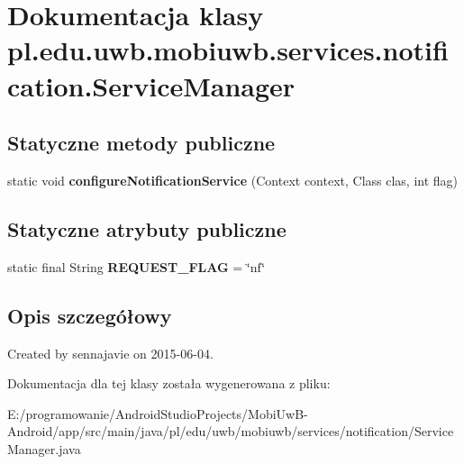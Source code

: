 \hypertarget{classpl_1_1edu_1_1uwb_1_1mobiuwb_1_1services_1_1notification_1_1_service_manager}{}\section{Dokumentacja klasy pl.\+edu.\+uwb.\+mobiuwb.\+services.\+notification.\+Service\+Manager}
\label{classpl_1_1edu_1_1uwb_1_1mobiuwb_1_1services_1_1notification_1_1_service_manager}
\subsection*{Statyczne metody publiczne}
\begin{DoxyCompactItemize}
\item 
\hypertarget{classpl_1_1edu_1_1uwb_1_1mobiuwb_1_1services_1_1notification_1_1_service_manager_a9234c37dabf29680288498eed48a0ba4}{}static void {\bfseries configure\+Notification\+Service} (Context context, Class clas, int flag)\label{classpl_1_1edu_1_1uwb_1_1mobiuwb_1_1services_1_1notification_1_1_service_manager_a9234c37dabf29680288498eed48a0ba4}

\end{DoxyCompactItemize}
\subsection*{Statyczne atrybuty publiczne}
\begin{DoxyCompactItemize}
\item 
\hypertarget{classpl_1_1edu_1_1uwb_1_1mobiuwb_1_1services_1_1notification_1_1_service_manager_a080b06fdaca7755acb6bb23d67403aaa}{}static final String {\bfseries R\+E\+Q\+U\+E\+S\+T\+\_\+\+F\+L\+A\+G} = \char`\"{}nf\char`\"{}\label{classpl_1_1edu_1_1uwb_1_1mobiuwb_1_1services_1_1notification_1_1_service_manager_a080b06fdaca7755acb6bb23d67403aaa}

\end{DoxyCompactItemize}


\subsection{Opis szczegółowy}
Created by sennajavie on 2015-\/06-\/04. 

Dokumentacja dla tej klasy została wygenerowana z pliku\+:\begin{DoxyCompactItemize}
\item 
E\+:/programowanie/\+Android\+Studio\+Projects/\+Mobi\+Uw\+B-\/\+Android/app/src/main/java/pl/edu/uwb/mobiuwb/services/notification/Service\+Manager.\+java\end{DoxyCompactItemize}
